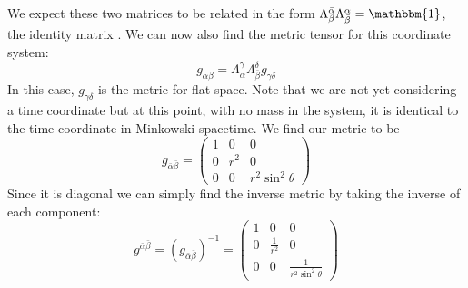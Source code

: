 \documentclass[11pt]{article}
\numberwithin{equation}{section}
\numberwithin{figure}{section}
\numberwithin{table}{section}
\begin{document}
We expect these two matrices to be related in the form $\Lambda_\beta^{\bar\alpha}\Lambda_{\bar\beta}^\alpha=\mathbbm{1}$, the identity matrix \cite{dunsby}. We can now also find the metric tensor for this coordinate system:
\begin{equation}
    g_{\alpha\beta}=\Lambda^\gamma_{\bar\alpha}\Lambda^\delta_{\bar\beta}g_{\gamma\delta}
\end{equation}
In this case, $g_{\gamma\delta}$ is the metric for flat space. Note that we are not yet considering a time coordinate but at this point, with no mass in the system, it is identical to the time coordinate in Minkowski spacetime. We find our metric to be 
\begin{equation}
    g_{\bar\alpha\bar\beta}=
    \begin{pmatrix}
        1&0&0\\
        0&r^2&0\\
        0&0&r^2\sin^2\theta
    \end{pmatrix}
    \label{eqn:spherical polars metric}
\end{equation}
Since it is diagonal we can simply find the inverse metric by taking the inverse of each component:
\begin{equation}
    g^{\bar\alpha\bar\beta}=(g_{\bar\alpha\bar\beta})^{-1}=
    \begin{pmatrix}
        1&0&0\\
        0&\frac{1}{r^2}&0\\
        0&0&\frac{1}{r^2\sin^2\theta}
    \end{pmatrix}
    \label{eqn:spherical polars inverse metric}
\end{equation}
\end{document}
